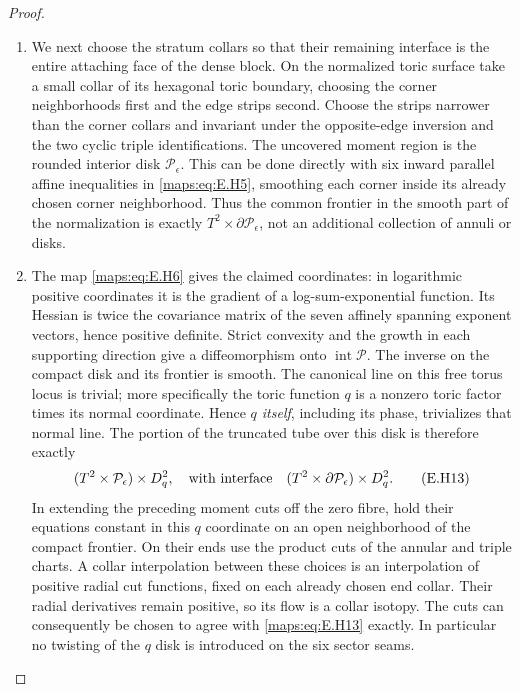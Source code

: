 \begin{proof}
\begin{enumerate}[label=\arabic*.,leftmargin=*]
\item We next choose the stratum collars so that their remaining
interface is the entire attaching face of the dense block.
On the normalized toric surface take a small collar of its
hexagonal toric boundary, choosing the corner neighborhoods
first and the edge strips second.  Choose the strips narrower
than the corner collars and invariant under the opposite-edge
inversion and the two cyclic triple identifications.  The
uncovered moment region is the rounded interior disk
$\mathcal P_\epsilon$.  This can be done directly with six
inward parallel affine inequalities in \eqref{maps:eq:E.H5}, smoothing each
corner inside its already chosen corner neighborhood.  Thus the
common frontier in the smooth part of the normalization is
exactly $T^2\times\partial\mathcal P_\epsilon$, not an additional
collection of annuli or disks.

\item The map \eqref{maps:eq:E.H6} gives the claimed coordinates: in logarithmic
positive coordinates it is the gradient of a log-sum-exponential
function.  Its Hessian is twice the covariance matrix of the
seven affinely spanning exponent vectors, hence positive
definite.  Strict convexity and the growth in each supporting
direction give a diffeomorphism onto
$\operatorname{int}\mathcal P$.  The inverse on the compact
disk and its frontier is smooth.  The canonical line on this
free torus locus is trivial; more specifically the toric
function $q$ is a nonzero toric factor times its normal
coordinate.  Hence \emph{$q$ itself}, including its phase,
trivializes that normal line.  The portion of the truncated
tube over this disk is therefore exactly
\[
 (T^2\times\mathcal P_\epsilon)\times D^2_q,
 \quad\hbox{with interface}\quad
 (T^2\times\partial\mathcal P_\epsilon)\times D^2_q.
 \tag{E.H13}\label{maps:eq:E.H13}
\]
In extending the preceding moment cuts off the zero fibre,
hold their equations constant in this $q$ coordinate on an
open neighborhood of the compact frontier.  On their ends
use the product cuts of the annular and triple charts.  A
collar interpolation between these choices is an interpolation
of positive radial cut functions, fixed on each already chosen
end collar.  Their radial derivatives remain positive, so its
flow is a collar isotopy.  The cuts can consequently be chosen
to agree with \eqref{maps:eq:E.H13} exactly.  In particular no twisting of
the $q$ disk is introduced on the six sector seams.


\end{enumerate}
\end{proof}

